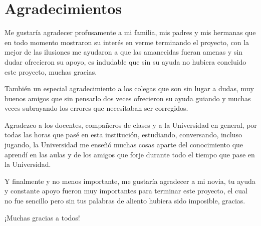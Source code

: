\chapter*{Agradecimientos} %


%

Me gustaría agradecer profusamente a mi familia, mis padres y mis hermanas que en todo momento mostraron su interés en verme terminando el proyecto, con la mejor de las ilusiones me ayudaron a que las amanecidas fueran amenas y sin dudar ofrecieron su apoyo, es indudable que sin su ayuda no hubiera concluido este proyecto, muchas gracias.

También un especial agradecimiento a los colegas que son sin lugar a dudas, muy buenos amigos que sin pensarlo dos veces ofrecieron su ayuda guiando y muchas veces subrayando los errores que necesitaban ser corregidos.

Agradezco a los docentes, compañeros de clases y a la Universidad en general, por todas las horas que pasé en esta institución, estudiando, conversando, incluso jugando, la Universidad me enseñó muchas cosas aparte del conocimiento que aprendí en las aulas y de los amigos que forje durante todo el tiempo que pase en la Universidad.

Y finalmente y no menos importante, me gustaría agradecer a mi novia, tu ayuda y constante apoyo fueron muy importantes para terminar este proyecto, el cual no fue sencillo pero sin tus palabras de aliento hubiera sido imposible, gracias.


¡Muchas gracias a todos!
